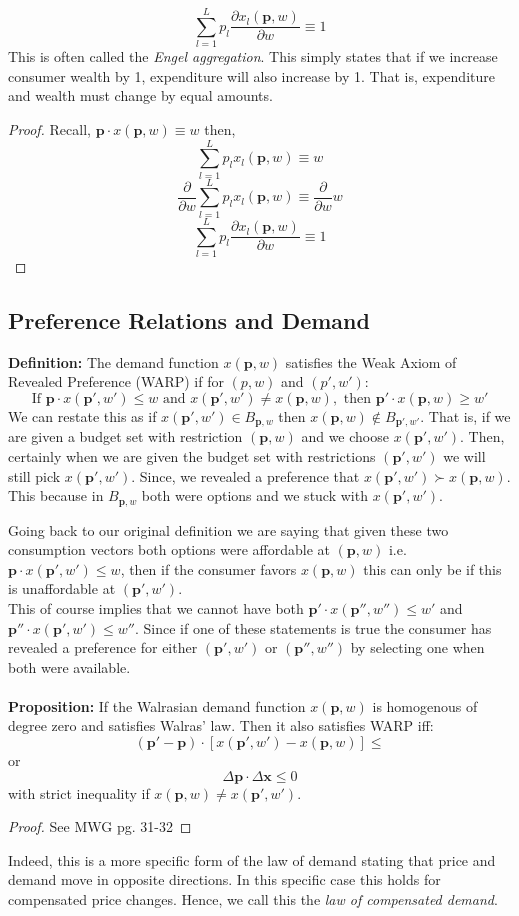 \documentclass[12pt]{article}
\let\bf\oldbf
\let\bf\textbf
\begin{document}
\begin{equation}\sum^L_{l=1}p_l\frac{\partial x_l(\bf{p}, w)}{\partial w} \equiv 1\end{equation}
This is often called the \emph{Engel aggregation}. This simply states that if we increase consumer wealth by 1, expenditure will also increase by 1. That is, expenditure and wealth must change by equal amounts.
\begin{proof}
Recall, $\bf{p}\cdot x(\bf{p}, w) \equiv w$ then,
$$\sum^L_{l=1}p_lx_l(\bf{p},w) \equiv w$$
$$\frac{\partial}{\partial w}\sum^L_{l=1}p_lx_l(\bf{p},w) \equiv \frac{\partial}{\partial w}w$$
$$\sum^L_{l=1}p_l\frac{\partial x_l(\bf{p}, w)}{\partial w} \equiv 1$$
\end{proof}
\subsection{Preference Relations and Demand}
\bf{Definition:} The demand function $x(\bf{p},w)$ satisfies the Weak Axiom of Revealed Preference (WARP) if for $(p,w)$ and $(p',w')$:
$$\text{If } \bf{p}\cdot x(\bf{p}',w') \leq w \text{ and } x(\bf{p}', w') \not= x(\bf{p}, w), \text{ then } \bf{p}'\cdot x(\bf{p}, w) \geq w'$$
We can restate this as if $x(\bf{p}',w') \in B_{\bf{p}, w}$ then $x(\bf{p}, w)\not\in B_{\bf{p}', w'}$. That is, if we are given a budget set with restriction $(\bf{p}, w)$ and we choose $x(\bf{p}', w')$. Then, certainly when we are given the budget set with restrictions $(\bf{p}', w')$ we will still pick $x(\bf{p}', w')$. Since, we revealed a preference that $x(\bf{p}', w') \succ x(\bf{p}, w)$. This because in $B_{\bf{p},w}$ both were options and we stuck with $x(\bf{p}', w')$.

Going back to our original definition we are saying that given these two consumption vectors both options were affordable at $(\bf{p},w)$ i.e. $\bf{p}\cdot x(\bf{p}',w') \leq w$, then if the consumer favors $x(\bf{p},w)$ this can only be if this is unaffordable at $(\bf{p}', w')$.
\vspace{10pt} 
\\This of course implies that we cannot have both $\bf{p}'\cdot x(\bf{p}'',w'') \leq w'$ and $\bf{p}''\cdot x(\bf{p}',w') \leq w''$. Since if one of these statements is true the consumer has revealed a preference for either $(\bf{p}', w')$ or $(\bf{p}'', w'')$ by selecting one when both were available.
\\ \bf{\\Proposition: } If the Walrasian demand function $x(\bf{p}, w)$ is homogenous of degree zero and satisfies Walras' law. Then it also satisfies WARP iff:
\begin{equation}(\bf{p}' - \bf{p})\cdot[x(\bf{p}', w') - x(\bf{p}, w)] \leq \end{equation}
or
$$\Delta\bf{p}\cdot\Delta \bf{x} \leq 0$$
with strict inequality if $x(\bf{p}, w) \not= x(\bf{p}', w')$.
\begin{proof} See MWG pg. 31-32
\end{proof}
Indeed, this is a more specific form of the law of demand stating that price and demand move in opposite directions. In this specific case this holds for compensated price changes. Hence, we call this the \emph{law of compensated demand}.
\end{document}
